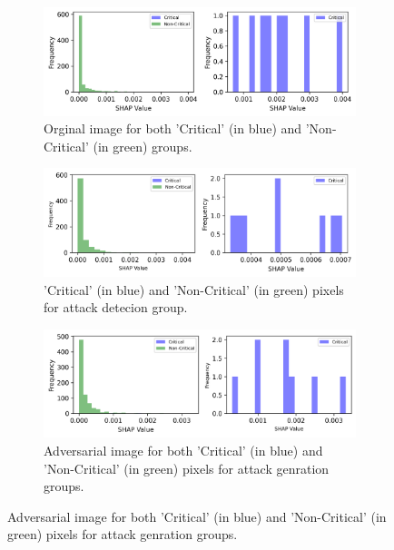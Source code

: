 \documentclass[10pt, conference, a4paper, final]{IEEEtran}
\begin{document}
    
    \begin{figure}[h]
        \centering
     
        \begin{subfigure}{\columnwidth}
            \centering
            \includegraphics[width=\linewidth]{paper_images/Originalhistograms.png}
            \caption{ Orginal image for both 'Critical' (in blue) and 'Non-Critical' (in green) groups.}
           
        \end{subfigure}
        \par\medskip %

        \begin{subfigure}{\columnwidth}
            \centering
            \includegraphics[width=\linewidth]{paper_images/Detectionhistograms.png}
            \caption{'Critical' (in blue) and 'Non-Critical' (in green) pixels for attack detecion group.}
        \end{subfigure}
        \par\medskip %
        \begin{subfigure}{\columnwidth}
            \centering
            \includegraphics[width=\linewidth]{paper_images/Generationhistograms.png}
            \caption{Adversarial image for both 'Critical' (in blue) and 'Non-Critical' (in green) pixels for attack genration groups.}
          

\end{subfigure}
\end{figure}
\end{document}
